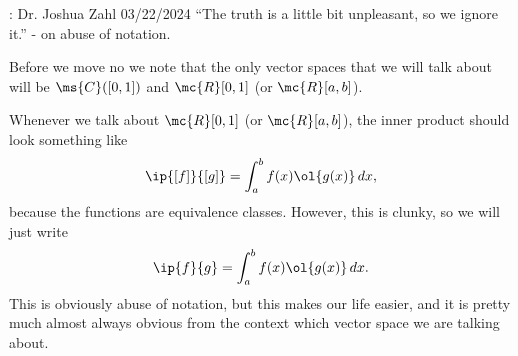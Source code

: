 \begin{nquote}{: Dr. Joshua Zahl 03/22/2024}
    ``The truth is a little bit unpleasant, so we ignore it.'' - on abuse of notation.
\end{nquote}

Before we move no we note that the only vector spaces that we will talk about will be \(\ms{C}([0,1])\) and \(\mc{R}[0,1]\) (or \(\mc{R}[a,b]\)).

\begin{notation}
    Whenever we talk about \(\mc{R}[0,1]\) (or \(\mc{R}[a,b]\)), the inner product should look something like
    \begin{equation*} 
        \ip{[f]}{[g]}=\int_a^b f(x) \ol{g(x)} \, dx,
    \end{equation*}
    because the functions are equivalence classes. However, this is clunky, so we will just write 
    \begin{equation*} 
        \ip{f}{g}=\int_a^b f(x) \ol{g(x)} \, dx.
    \end{equation*}
    This is obviously abuse of notation, but this makes our life easier, and it is pretty much almost always obvious from the context which vector space we are talking about.
\end{notation}

